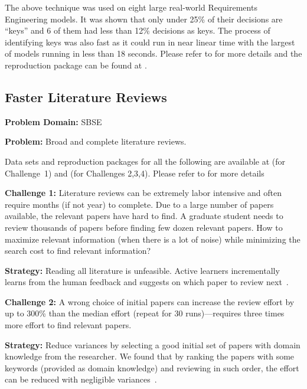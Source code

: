 \documentclass[sigconf,anonymous,review]{acmart}
\begin{document}
The above technique was used on eight large real-world Requirements Engineering models. It was shown that only under 25\% of their decisions are ``keys'' and 6 of them had less than 12\% decisions as keys. The process of identifying keys was also fast as it could run in near linear time with the largest of models running in less than 18 seconds. Please refer to \cite{mathew2017shorter} for more details and the reproduction package can be found at .

\subsection{Faster Literature Reviews}
\noindent\textbf{Problem Domain: } SBSE

\noindent\textbf{Problem: }
 Broad and complete literature reviews.
 
 Data sets and reproduction packages for all the following are available at  (for Challenge~1) and 
 (for Challenges 2,3,4). Please refer to \cite{yu2016finding, YuM17} for more details
   
\vspace{1.0ex}
\noindent\textbf{Challenge 1: }
Literature reviews can be extremely labor intensive and often require months (if not year) to complete. Due to a large number of papers available, the relevant papers have hard to find. A graduate student needs to review thousands of papers before finding few dozen relevant papers.
How to maximize relevant information (when there is a lot of noise) while minimizing the search cost to find relevant information?

\noindent\textbf{Strategy: }
  Reading all   literature  is unfeasible. Active learners incrementally learns from the human feedback and suggests on which paper to review next~\cite{YuM17a}.
   
\vspace{1.0ex}
\noindent\textbf{Challenge 2: }
A wrong choice of initial papers can increase the review effort by up to 300\% than the median effort (repeat for 30 runs)---requires three times more effort to find   relevant papers. 

\noindent\textbf{Strategy: }
Reduce  variances  by selecting a good initial set of papers with domain knowledge from the researcher. We found that by ranking the papers with some  keywords (provided as domain knowledge) and reviewing in such order, the effort can be   reduced with negligible variances~\cite{YuM17}.
   
\end{document}
